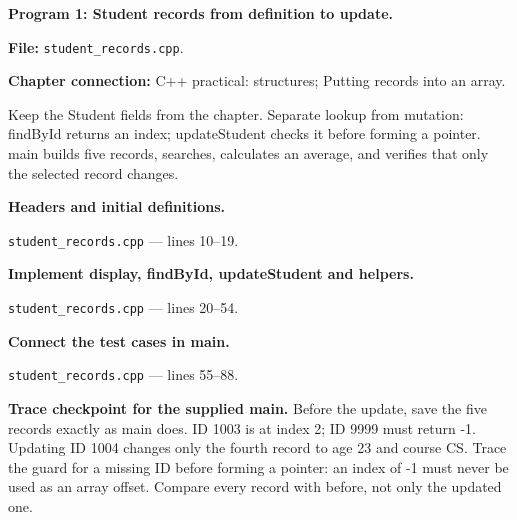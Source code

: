 \textbf{Program 1: Student records from definition to update.}

\textbf{File:} \texttt{student\_records.cpp}.

\textbf{Chapter connection:} C++ practical: structures; Putting records into an array.

Keep the Student fields from the chapter. Separate lookup from mutation: findById returns an index; updateStudent checks it before forming a pointer. main builds five records, searches, calculates an average, and verifies that only the selected record changes.



\begin{utpsteps}\setcounter{enumi}{0}\item \textbf{Headers and initial definitions.}\end{utpsteps}

\texttt{student\_records.cpp} --- lines 10--19.




\tcbbreak

\begin{utpsteps}\setcounter{enumi}{1}\item \textbf{Implement display, findById, updateStudent and helpers.}\end{utpsteps}

\texttt{student\_records.cpp} --- lines 20--54.






\tcbbreak

\begin{utpsteps}\setcounter{enumi}{2}\item \textbf{Connect the test cases in main.}\end{utpsteps}

\texttt{student\_records.cpp} --- lines 55--88.

\textbf{Trace checkpoint for the supplied main.} Before the update, save the five records exactly as main does. ID 1003 is at index 2; ID 9999 must return -1. Updating ID 1004 changes only the fourth record to age 23 and course CS. Trace the guard for a missing ID before forming a pointer: an index of -1 must never be used as an array offset. Compare every record with before, not only the updated one.

